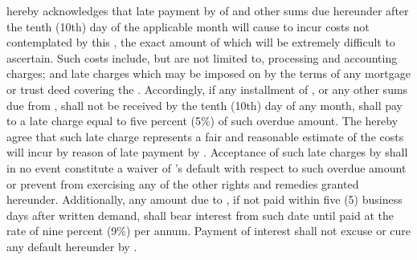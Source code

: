\lessee hereby acknowledges that late payment by \lessee of \monthlyRent and other sums due hereunder after the tenth (10th) day of the applicable month will cause \lessor to incur costs not contemplated by this \lease, the exact amount of which will be extremely difficult to ascertain. Such costs include, but are not limited to, processing and accounting charges; and late charges which may be imposed on \lessor by the terms of any mortgage or trust deed covering the \premises. Accordingly, if any installment of \monthlyRent, or any other sums due from \lessee, shall not be received by the tenth (10th) day of any month, \lessee shall pay to \lessor a late charge equal to five percent (5\%) of such overdue amount. The \parties hereby agree that such late charge represents a fair and reasonable estimate of the costs \lessor will incur by reason of late payment by \lessee. Acceptance of such late charges by \lessor shall in no event constitute a waiver of \lessee's default with respect to such overdue amount or prevent \lessor from exercising any of the other rights and remedies granted hereunder. Additionally, any amount due to \lessor, if not paid within five (5) business days after written demand, shall bear interest from such date until paid at the rate of nine percent (9\%) per annum. Payment of interest shall not excuse or cure any default hereunder by \lessee.
